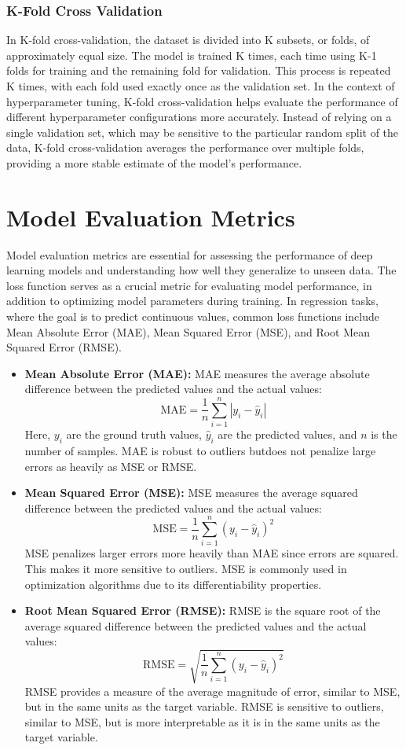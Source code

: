 \subsubsection{K-Fold Cross Validation}
In K-fold cross-validation, the dataset is divided into K subsets, or folds, of approximately equal size. The model is trained K times, each time using K-1 folds for training and the remaining fold for validation. This process is repeated K times, with each fold used exactly once as the validation set. In the context of hyperparameter tuning, K-fold cross-validation helps evaluate the performance of different hyperparameter configurations more accurately. Instead of relying on a single validation set, which may be sensitive to the particular random split of the data, K-fold cross-validation averages the performance over multiple folds, providing a more stable estimate of the model's performance.
\section{Model Evaluation Metrics}
Model evaluation metrics are essential for assessing the performance of deep learning models and understanding how well they generalize to unseen data. The loss function serves as a crucial metric for evaluating model performance, in addition to optimizing model parameters during training. In regression tasks, where the goal is to predict continuous values, common loss functions include Mean Absolute Error (MAE), Mean Squared Error (MSE), and Root Mean Squared Error (RMSE).
\begin{itemize}
\item \textbf{Mean Absolute Error (MAE):} MAE measures the average absolute difference between the predicted values and the actual values:\[ \text{MAE} = \frac{1}{n} \sum_{i=1}^{n} |y_i - \hat{y}_i| \] Here, $y_i$ are the ground truth values, $\hat{y}_i$ are the predicted values, and $n$ is the number of samples. MAE is robust to outliers butdoes not penalize large errors as heavily as MSE or RMSE.
\item \textbf{Mean Squared Error (MSE):} MSE measures the average squared difference between the predicted values and the actual values:\[ \text{MSE} = \frac{1}{n} \sum_{i=1}^{n} (y_i - \hat{y}_i)^2 \] MSE penalizes larger errors more heavily than MAE since errors are squared. This makes it more sensitive to outliers. MSE is commonly used in optimization algorithms due to its differentiability properties.
\item \textbf{Root Mean Squared Error (RMSE):} RMSE is the square root of the average squared difference between the predicted values and the actual values: \[ \text{RMSE} = \sqrt{\frac{1}{n} \sum_{i=1}^{n} (y_i - \hat{y}_i)^2} \]RMSE provides a measure of the average magnitude of error, similar to MSE, but in the same units as the target variable. RMSE is sensitive to outliers, similar to MSE, but is more interpretable as it is in the same units as the target variable.
\end{itemize}
